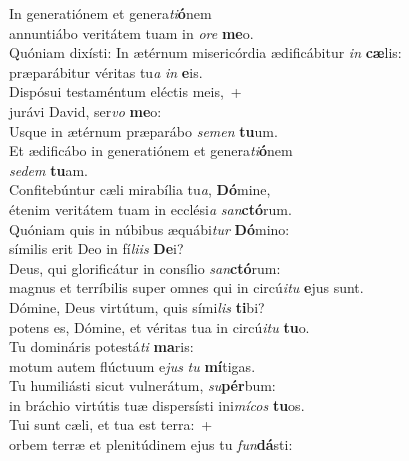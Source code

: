 \evenverse In generatiónem et genera\textit{ti}\textbf{ó}nem~\*\\
\evenverse annuntiábo veritátem tuam in \textit{o}\textit{re} \textbf{me}o.\\
\oddverse Quóniam dixísti: In ætérnum misericórdia ædificábitur \textit{in} \textbf{cæ}lis:~\*\\
\oddverse præparábitur véritas tu\textit{a} \textit{in} \textbf{e}is.\\
\evenverse Dispósui testaméntum eléctis meis,~+\\
\evenverse  jurávi David, ser\textit{vo} \textbf{me}o:~\*\\
\evenverse Usque in ætérnum præparábo \textit{se}\textit{men} \textbf{tu}um.\\
\oddverse Et ædificábo in generatiónem et genera\textit{ti}\textbf{ó}nem~\*\\
\oddverse \textit{se}\textit{dem} \textbf{tu}am.\\
\evenverse Confitebúntur cæli mirabília tu\textit{a}, \textbf{Dó}mine,~\*\\
\evenverse étenim veritátem tuam in ecclési\textit{a} \textit{san}\textbf{ctó}rum.\\
\oddverse Quóniam quis in núbibus æquábi\textit{tur} \textbf{Dó}mino:~\*\\
\oddverse símilis erit Deo in fí\textit{li}\textit{is} \textbf{De}i?\\
\evenverse Deus, qui glorificátur in consílio \textit{san}\textbf{ctó}rum:~\*\\
\evenverse magnus et terríbilis super omnes qui in circú\textit{i}\textit{tu} \textbf{e}jus sunt.\\
\oddverse Dómine, Deus virtútum, quis sími\textit{lis} \textbf{ti}bi?~\*\\
\oddverse potens es, Dómine, et véritas tua in circú\textit{i}\textit{tu} \textbf{tu}o.\\
\evenverse Tu domináris potestá\textit{ti} \textbf{ma}ris:~\*\\
\evenverse motum autem flúctuum e\textit{jus} \textit{tu} \textbf{mí}tigas.\\
\oddverse Tu humiliásti sicut vulnerátum, \textit{su}\textbf{pér}bum:~\*\\
\oddverse in bráchio virtútis tuæ dispersísti ini\textit{mí}\textit{cos} \textbf{tu}os.\\
\evenverse Tui sunt cæli, et tua est terra:~+\\
\evenverse  orbem terræ et plenitúdinem ejus tu \textit{fun}\textbf{dá}sti:~\*\\
